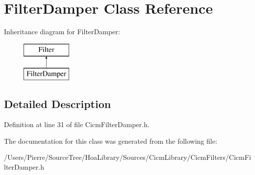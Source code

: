 \hypertarget{class_filter_damper}{\section{Filter\-Damper Class Reference}
\label{class_filter_damper}
}
Inheritance diagram for Filter\-Damper\-:\begin{figure}[H]
\begin{center}
\leavevmode
\includegraphics[height=2.000000cm]{class_filter_damper}
\end{center}
\end{figure}


\subsection{Detailed Description}


Definition at line 31 of file Cicm\-Filter\-Damper.\-h.



The documentation for this class was generated from the following file\-:\begin{DoxyCompactItemize}
\item 
/\-Users/\-Pierre/\-Source\-Tree/\-Hoa\-Library/\-Sources/\-Cicm\-Library/\-Cicm\-Filters/Cicm\-Filter\-Damper.\-h\end{DoxyCompactItemize}

